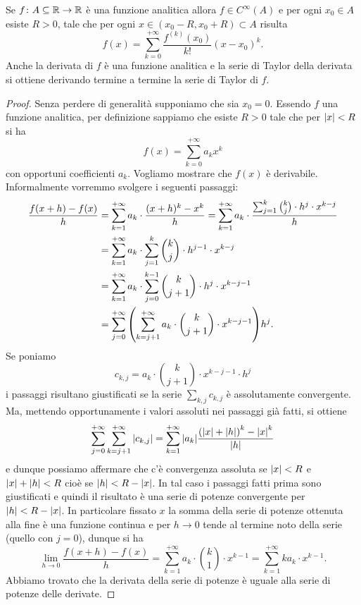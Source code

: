 \begin{theorem}
\label{th:48765}%
Se $f\colon A\subseteq {\mathbb R}\to{\mathbb R}$ è una funzione analitica allora
$f\in C^\infty(A)$ e per ogni $x_0\in A$ esiste $R>0$, tale che
per ogni $x \in (x_0-R, x_0+R)\subset A$ risulta
\begin{equation}\label{eq:2344494}
  f(x) = \sum_{k=0}^{+\infty} \frac{f^{(k)}(x_0)}{k!}(x-x_0)^k.
\end{equation}
Anche la derivata di $f$ è una funzione analitica e la serie
di Taylor della derivata si ottiene derivando termine a termine
la serie di Taylor di $f$.
\end{theorem}
%
\begin{proof}
Senza perdere di generalità supponiamo che sia $x_0=0$. 
Essendo $f$
una funzione analitica, per definizione sappiamo che esiste $R>0$
tale che per ${\left|x\right|}<R$ si ha
\[
f(x) = \sum_{k=0}^{+\infty} a_k x^k
\]
con opportuni coefficienti $a_k$. 
Vogliamo mostrare che $f(x)$ è derivabile.
Informalmente vorremmo svolgere i seguenti passaggi:
\begin{align*}
\frac{f(x+h) - f(x)}{h}
&= \sum_{k=1}^{+\infty} a_k \cdot \frac{(x+h)^k-x^k}{h}
= \sum_{k=1}^{+\infty} a_k \cdot \frac{\sum_{j=1}^k {k\choose j} \cdot h^j \cdot x^{k-j}}{h} \\
&= \sum_{k=1}^{+\infty} a_k \cdot \sum_{j=1}^k {k\choose j} \cdot h^{j-1} \cdot x^{k-j} \\
&= \sum_{k=1}^{+\infty} a_k \cdot \sum_{j=0}^{k-1} {k\choose j+1} \cdot h^j \cdot x^{k-j-1} \\
&= \sum_{j=0}^{+\infty} {\left( \sum_{k=j+1}^{+\infty} a_k \cdot {k\choose j+1} \cdot x^{k-j-1} \right)} h^j.
\end{align*}
Se poniamo
\[
  c_{k,j} = a_k\cdot {k\choose j+1}\cdot x^{k-j-1}\cdot h^j
\]
i passaggi risultano giustificati se la serie $\sum_{k,j} c_{k,j}$
è assolutamente convergente. Ma, mettendo opportunamente
i valori assoluti nei passaggi già fatti, si ottiene
\[
  \sum_{j=0}^{+\infty} \sum_{k=j+1}^{+\infty} {\left|c_{k,j}\right|}
  =  \sum_{k=1}^{+\infty} {\left|a_k\right|} \frac{{\left( {\left|x\right|} + {\left|h\right|} \right)}^k-{\left|x\right|}^k}{{\left|h\right|}}
\]
e dunque possiamo affermare che c'è convergenza assoluta
se ${\left|x\right|}<R$ e ${\left|x\right|}+{\left|h\right|}<R$ cioè se ${\left|h\right|}< R-{\left|x\right|}$. In tal caso
i passaggi fatti prima sono giustificati e quindi il risultato
è una serie di potenze convergente per ${\left|h\right|}<R-{\left|x\right|}$. In particolare
fissato $x$
la somma della serie di potenze ottenuta alla fine è una funzione continua
e per $h\to 0$
tende al termine noto della serie (quello con $j=0$), dunque si ha
\[
  \lim_{h\to 0} \frac{f(x+h)-f(x)}{h}
  = \sum_{k=1}^{+\infty} a_k \cdot {k \choose 1} \cdot x^{k-1}
  = \sum_{k=1}^{+\infty} k a_k \cdot x^{k-1}.
\]
Abbiamo trovato che la derivata della serie di potenze è uguale
alla serie di potenze delle derivate.


\end{proof}
